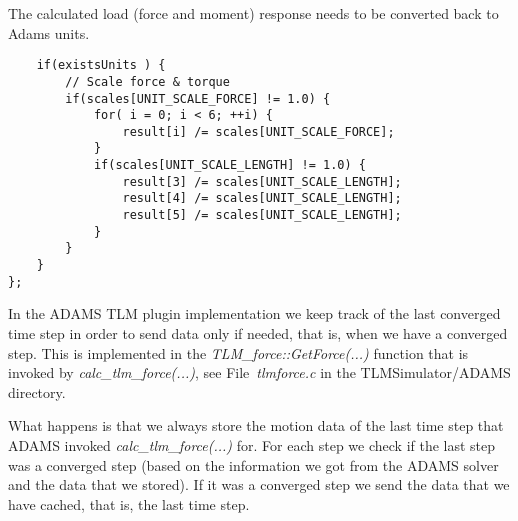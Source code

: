 The calculated load (force and moment) response needs to be converted back to Adams units.

{
\scriptsize
\begin{verbatim}
    if(existsUnits ) {
        // Scale force & torque
        if(scales[UNIT_SCALE_FORCE] != 1.0) {
            for( i = 0; i < 6; ++i) {
                result[i] /= scales[UNIT_SCALE_FORCE];
            }
            if(scales[UNIT_SCALE_LENGTH] != 1.0) {
                result[3] /= scales[UNIT_SCALE_LENGTH];
                result[4] /= scales[UNIT_SCALE_LENGTH];
                result[5] /= scales[UNIT_SCALE_LENGTH];
            }
        }
    }
};
\end{verbatim}
}


In the ADAMS TLM plugin implementation we keep track of the last converged time step in order to send data only if needed, that is, when we have a converged step. 
This is implemented in the {\em TLM\_force::GetForce(...)} function that is invoked by {\em calc\_tlm\_force(...)}, see File~{\em tlmforce.c} in the TLMSimulator/ADAMS directory.

What happens is that we always store the motion data of the last time step that ADAMS invoked {\em calc\_tlm\_force(...)} for. 
For each step we check if the last step was a converged step (based on the information we got from the ADAMS solver and the data that we stored).
If it was a converged step we send the data that we have cached, that is, the last time step.

